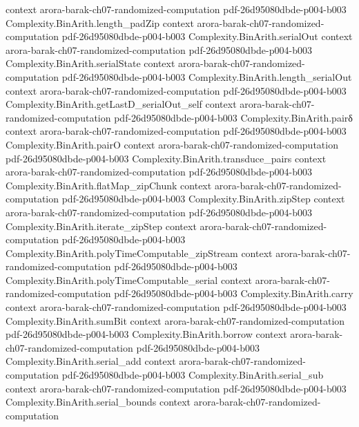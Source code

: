 \begin{theorem}
  {context}
  {arora-barak-ch07-randomized-computation}
  {pdf-26d95080dbde-p004-b003}
\proofstep
  {Complexity.BinArith.length_padZip}
  {context}
  {arora-barak-ch07-randomized-computation}
  {pdf-26d95080dbde-p004-b003}
\proofstep
  {Complexity.BinArith.serialOut}
  {context}
  {arora-barak-ch07-randomized-computation}
  {pdf-26d95080dbde-p004-b003}
\proofstep
  {Complexity.BinArith.serialState}
  {context}
  {arora-barak-ch07-randomized-computation}
  {pdf-26d95080dbde-p004-b003}
\proofstep
  {Complexity.BinArith.length_serialOut}
  {context}
  {arora-barak-ch07-randomized-computation}
  {pdf-26d95080dbde-p004-b003}
\proofstep
  {Complexity.BinArith.getLastD_serialOut_self}
  {context}
  {arora-barak-ch07-randomized-computation}
  {pdf-26d95080dbde-p004-b003}
\proofstep
  {Complexity.BinArith.pairδ}
  {context}
  {arora-barak-ch07-randomized-computation}
  {pdf-26d95080dbde-p004-b003}
\proofstep
  {Complexity.BinArith.pairO}
  {context}
  {arora-barak-ch07-randomized-computation}
  {pdf-26d95080dbde-p004-b003}
\proofstep
  {Complexity.BinArith.transduce_pairs}
  {context}
  {arora-barak-ch07-randomized-computation}
  {pdf-26d95080dbde-p004-b003}
\proofstep
  {Complexity.BinArith.flatMap_zipChunk}
  {context}
  {arora-barak-ch07-randomized-computation}
  {pdf-26d95080dbde-p004-b003}
\proofstep
  {Complexity.BinArith.zipStep}
  {context}
  {arora-barak-ch07-randomized-computation}
  {pdf-26d95080dbde-p004-b003}
\proofstep
  {Complexity.BinArith.iterate_zipStep}
  {context}
  {arora-barak-ch07-randomized-computation}
  {pdf-26d95080dbde-p004-b003}
\proofstep
  {Complexity.BinArith.polyTimeComputable_zipStream}
  {context}
  {arora-barak-ch07-randomized-computation}
  {pdf-26d95080dbde-p004-b003}
\proofstep
  {Complexity.BinArith.polyTimeComputable_serial}
  {context}
  {arora-barak-ch07-randomized-computation}
  {pdf-26d95080dbde-p004-b003}
\proofstep
  {Complexity.BinArith.carry}
  {context}
  {arora-barak-ch07-randomized-computation}
  {pdf-26d95080dbde-p004-b003}
\proofstep
  {Complexity.BinArith.sumBit}
  {context}
  {arora-barak-ch07-randomized-computation}
  {pdf-26d95080dbde-p004-b003}
\proofstep
  {Complexity.BinArith.borrow}
  {context}
  {arora-barak-ch07-randomized-computation}
  {pdf-26d95080dbde-p004-b003}
\proofstep
  {Complexity.BinArith.serial_add}
  {context}
  {arora-barak-ch07-randomized-computation}
  {pdf-26d95080dbde-p004-b003}
\proofstep
  {Complexity.BinArith.serial_sub}
  {context}
  {arora-barak-ch07-randomized-computation}
  {pdf-26d95080dbde-p004-b003}
\proofstep
  {Complexity.BinArith.serial_bounds}
  {context}
  {arora-barak-ch07-randomized-computation}

\end{theorem}
